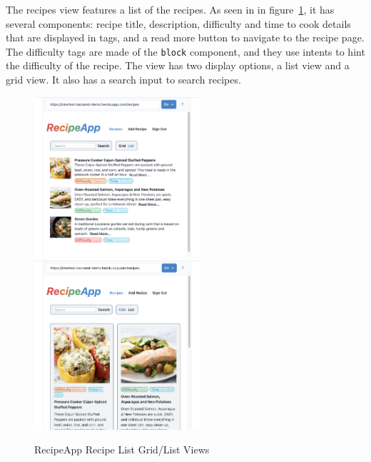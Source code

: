 The recipes view features a list of the recipes. As seen in in figure~\ref{fig:rec_recipe_list}, it has several components: recipe title, description, difficulty and time to cook details that are displayed in tags, and a read more button to navigate to the recipe page. The difficulty tags are made of the \texttt{block} component, and they use intents to hint the difficulty of the recipe. The view has two display options, a list view and a grid view. It also has a search input to search recipes.

\begin{figure}[htb]
  \centering
  \includegraphics[width=6.2cm]{thesis/paper/images/recipe_list.png}
  \,
  \includegraphics[width=6.2cm]{thesis/paper/images/recipe_grid.png}
  \caption{RecipeApp Recipe List Grid/List Views}%
  \label{fig:rec_recipe_list}%
\end{figure}


